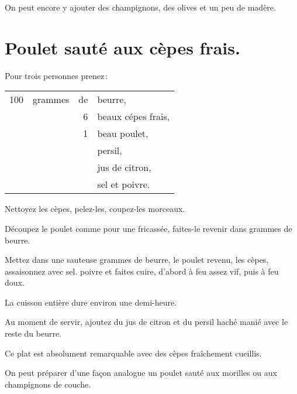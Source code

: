 On peut encore y ajouter des champignons, des olives et un peu de madère.

\section*{\centering Poulet sauté aux cèpes frais.}
{}

Pour trois personnes prenez :

\medskip

\footnotesize
\begin{longtable}{rrrp{16em}}
    100 & grammes & de & beurre,                                                                          \\
        &         &  6 & beaux cépes frais,                                                               \\
        &         &  1 & beau poulet,                                                                     \\
        &         &    & persil,                                                                          \\
        &         &    & jus de citron,                                                                   \\
        &         &    & sel et poivre.                                                                   \\
\end{longtable}
\normalsize

Nettoyez les cèpes, pelez-les, coupez-les morceaux.

Découpez le poulet comme pour une fricassée, faites-le revenir dans {\mmm} grammes
de beurre.

Mettez dans une sauteuse {\mmm} grammes de beurre, le poulet revenu, les cèpes,
assaisonnez avec sel. poivre et faites cuire, d'abord à feu assez vif, puis
à feu doux.

La cuisson entière dure environ une demi-heure.

Au moment de servir, ajoutez du jus de citron et du persil haché manié avec le
reste du beurre.

Ce plat est absolument remarquable avec des cèpes fraîchement cueillis.

\sk

On peut préparer d'une façon analogue un poulet sauté aux morilles ou aux
champignons de couche.


